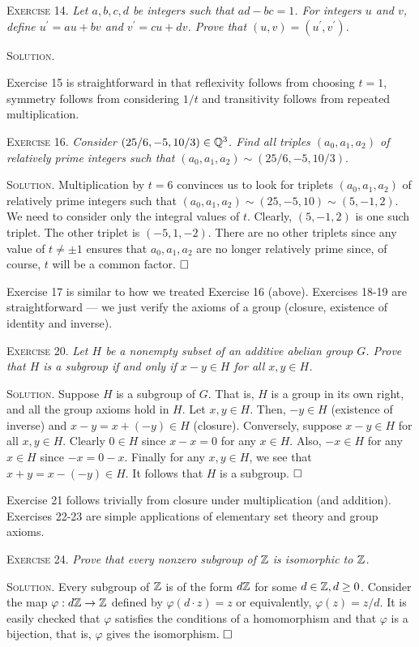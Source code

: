 \documentclass[11pt, leqno]{article}
\newcommand{\done}{\ensuremath{\hfill\square}}
\begin{document}
\textsc{Exercise 14}. \emph{Let $a,b,c,d$ be integers such that $ad-bc=1$. For integers $u$ and $v$, define $u^{\prime}=au+bv$ and $v^{\prime}=cu+dv$. Prove that $(u,v)=(u^{\prime},v^{\prime})$.}

\textsc{Solution}.

Exercise 15 is straightforward in that reflexivity follows from choosing $t=1$, symmetry follows from considering $1/t$ and transitivity follows from repeated multiplication.

\textsc{Exercise 16}. \emph{Consider $(25/6, -5, 10/3) \in \mathbb{Q}^3$. Find all triples $(a_0,a_1,a_2)$ of relatively prime integers such that $(a_0,a_1,a_2)\sim (25/6, -5, 10/3)$}.

\textsc{Solution}. Multiplication by $t=6$ convinces us to look for triplets $(a_0,a_1,a_2)$ of relatively prime integers such that $(a_0,a_1,a_2)\sim (25, -5, 10)\sim (5, -1, 2)$. We need to consider only the integral values of $t$. Clearly, $(5, -1, 2)$ is one such triplet. The other triplet is $(-5, 1, -2)$. There are no other triplets since any value of $t\ne \pm 1$ ensures that $a_0,a_1,a_2$ are no longer relatively prime since, of course, $t$ will be a common factor. \done

Exercise 17 is similar to how we treated Exercise 16 (above). Exercises 18-19 are straightforward --- we just verify the axioms of a group (closure, existence of identity and inverse).

\textsc{Exercise 20}. \emph{Let $H$ be a nonempty subset of an additive abelian group $G$. Prove that $H$ is a subgroup if and only if $x-y \in H$ for all $x,y\in H$.}

\textsc{Solution}. Suppose $H$ is a subgroup of $G$. That is, $H$ is a group in its own right, and all the group axioms hold in $H$. Let $x,y\in H$. Then, $-y \in H$ (existence of inverse) and $x-y = x+(-y) \in H$ (closure). Conversely, suppose $x-y \in H$ for all $x,y\in H$. Clearly $0 \in H$ since $x-x=0$ for any $x\in H$. Also, $-x \in H$ for any $x\in H$ since $-x = 0-x$. Finally for any $x,y\in H$, we see that $x+y = x-(-y) \in H$. It follows that $H$ is a subgroup. \done

Exercise 21 follows trivially from closure under multiplication (and addition). Exercises 22-23 are simple applications of elementary set theory and group axioms.

\textsc{Exercise 24}. \emph{Prove that every nonzero subgroup of $\mathbb{Z}$ is isomorphic to $\mathbb{Z}$.}

\textsc{Solution}. Every subgroup of $\mathbb{Z}$ is of the form $d\mathbb{Z}$ for some $d\in\mathbb{Z}, d\geq 0$. Consider the map $\varphi: d\mathbb{Z} \to \mathbb{Z}$ defined by $\varphi (d\cdot z) = z$ or equivalently, $\varphi(z) = z/d$. It is easily checked that $\varphi$ satisfies the conditions of a homomorphism and that $\varphi$ is a bijection, that is, $\varphi$ gives the isomorphism. \done
\end{document}
